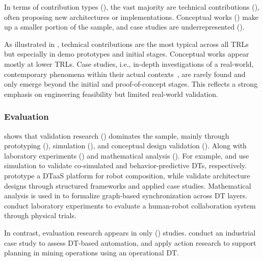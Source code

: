 


In terms of contribution types (), the vast majority are technical contributions (), often proposing new architectures or implementations. Conceptual works () make up a smaller portion of the sample, and case studies are underrepresented ().

As illustrated in , technical contributions are the most typical across all TRLs but especially in demo prototypes and initial stages. Conceptual works appear mostly at lower TRLs. Case studies, i.e., in-depth investigations of a real-world, contemporary phenomena within their actual contexts~\cite{crowe2011case}, are rarely found and only emerge beyond the initial and proof-of-concept stages. This reflects a strong emphasis on engineering feasibility but limited real-world validation.

\subsubsection{Evaluation}\label{sec:evaluation}

 shows that validation research () dominates the sample, mainly through prototyping (), simulation (), and conceptual design validation (). Along with laboratory experiments () and mathematical analysis (). For example, \textcite{hatledal2020co-simulation} and \textcite{chen2018digital} use simulation to validate co-simulated and behavior-predictive DTs, respectively. \textcite{larsen2024towards} prototype a DTaaS platform for robot composition, while \textcite{redelinghuys2020six-layer} validate architecture designs through structured frameworks and applied case studies. Mathematical analysis is used in \textcite{mahoro2023articulating} to formalize graph-based synchronization across DT layers. \textcite{savur2019hrc-sos} conduct laboratory experiments to evaluate a human-robot collaboration system through physical trials.

In contrast, evaluation research appears in only () studies. \textcite{ashtaritalkhestani2019architecture} conduct an industrial case study to assess DT-based automation, and \textcite{bertoni2022digital} apply action research to support planning in mining operations using an operational DT.



